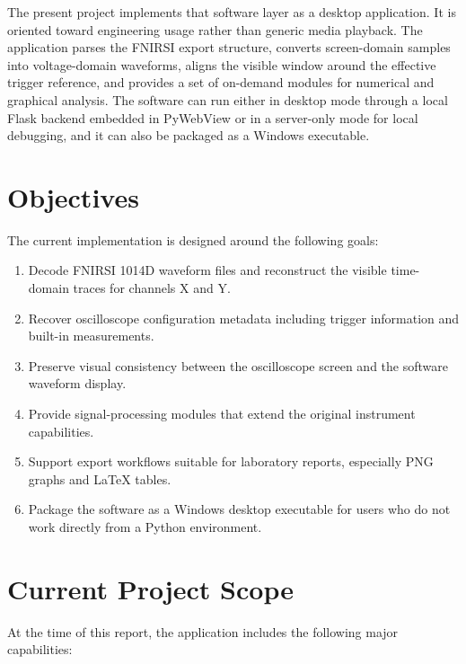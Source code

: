 \documentclass[conference]{IEEEtran}
\begin{document}
The present project implements that software layer as a desktop application. It is oriented toward engineering usage rather than generic media playback. The application parses the FNIRSI export structure, converts screen-domain samples into voltage-domain waveforms, aligns the visible window around the effective trigger reference, and provides a set of on-demand modules for numerical and graphical analysis. The software can run either in desktop mode through a local Flask backend embedded in PyWebView or in a server-only mode for local debugging, and it can also be packaged as a Windows executable.

\section{Objectives}
The current implementation is designed around the following goals:

\begin{enumerate}
    \item Decode FNIRSI 1014D waveform files and reconstruct the visible time-domain traces for channels X and Y.
    \item Recover oscilloscope configuration metadata including trigger information and built-in measurements.
    \item Preserve visual consistency between the oscilloscope screen and the software waveform display.
    \item Provide signal-processing modules that extend the original instrument capabilities.
    \item Support export workflows suitable for laboratory reports, especially PNG graphs and LaTeX tables.
    \item Package the software as a Windows desktop executable for users who do not work directly from a Python environment.
\end{enumerate}

\section{Current Project Scope}
At the time of this report, the application includes the following major capabilities:
\end{document}
